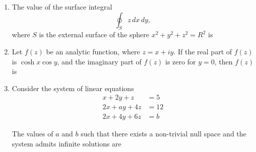 \documentclass[journal]{IEEEtran}
\begin{document}
\begin{enumerate}[leftmargin=0pt]
\hfill{}

\vspace{4mm}

\item
The value of the surface integral
\[
\oint_S z \, dx \, dy,
\]
where $S$ is the external surface of the sphere $x^2 + y^2 + z^2 = R^2$ is

\vspace{2mm}

\begin{enumerate}
\end{enumerate}

\hfill{}

\vspace{4mm}

\item
Let $f(z)$ be an analytic function, where $z = x + iy$. If the real part of $f(z)$ is $\cosh x \cos y$, and the imaginary part of $f(z)$ is zero for $y=0$, then $f(z)$ is

\vspace{2mm}

\begin{enumerate}
\end{enumerate}

\hfill{}

\vspace{4mm}

\item
Consider the system of linear equations
\begin{align*}
x + 2y + z &= 5 \\
2x + a y + 4z &= 12 \\
2x + 4y + 6z &= b
\end{align*}

The values of $a$ and $b$ such that there exists a non-trivial null space and the system admits infinite solutions are


\end{enumerate}
\end{document}
